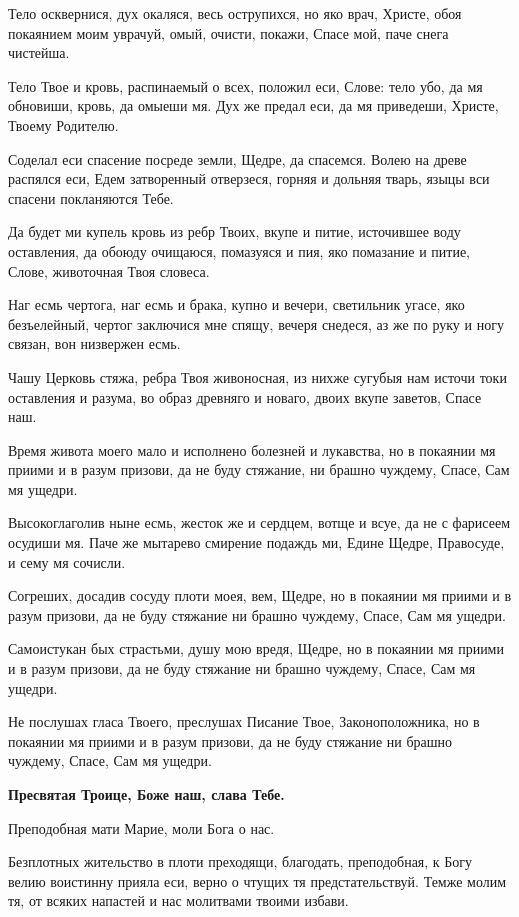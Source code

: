 Тело осквернися, дух окаляся, весь острупихся, но яко врач, Христе, обоя покаянием моим уврачуй, омый, очисти, покажи, Спасе мой, паче снега чистейша.

Тело Твое и кровь, распинаемый о всех, положил еси, Слове: тело убо, да мя обновиши, кровь, да омыеши мя. Дух же предал еси, да мя приведеши, Христе, Твоему Родителю.

Соделал еси спасение посреде земли, Щедре, да спасемся. Волею на древе распялся еси, Едем затворенный отверзеся, горняя и дольняя тварь, языцы вси спасени покланяются Тебе.

Да будет ми купель кровь из ребр Твоих, вкупе и питие, источившее воду оставления, да обоюду очищаюся, помазуяся и пия, яко помазание и питие, Слове, животочная Твоя словеса.

Наг есмь чертога, наг есмь и брака, купно и вечери, светильник угасе, яко безъелейный, чертог заключися мне спящу, вечеря снедеся, аз же по руку и ногу связан, вон низвержен есмь.

Чашу Церковь стяжа, ребра Твоя живоносная, из нихже сугубыя нам источи токи оставления и разума, во образ древняго и новаго, двоих вкупе заветов, Спасе наш.

Время живота моего мало и исполнено болезней и лукавства, но в покаянии мя приими и в разум призови, да не буду стяжание, ни брашно чуждему, Спасе, Сам мя ущедри.

Высокоглаголив ныне есмь, жесток же и сердцем, вотще и всуе, да не с фарисеем осудиши мя. Паче же мытарево смирение подаждь ми, Едине Щедре, Правосуде, и сему мя сочисли.

Согреших, досадив сосуду плоти моея, вем, Щедре, но в покаянии мя приими и в разум призови, да не буду стяжание ни брашно чуждему, Спасе, Сам мя ущедри.

Самоистукан бых страстьми, душу мою вредя, Щедре, но в покаянии мя приими и в разум призови, да не буду стяжание ни брашно чуждему, Спасе, Сам мя ущедри.

Не послушах гласа Твоего, преслушах Писание Твое, Законоположника, но в покаянии мя приими и в разум призови, да не буду стяжание ни брашно чуждему, Спасе, Сам мя ущедри.

\bfseries Пресвятая Троице, Боже наш, слава Тебе.

Преподобная мати Марие, моли Бога о нас.\normalfont{}

Безплотных жительство в плоти преходящи, благодать, преподобная, к Богу велию воистинну прияла еси, верно о чтущих тя предстательствуй. Темже молим тя, от всяких напастей и нас молитвами твоими избави.

